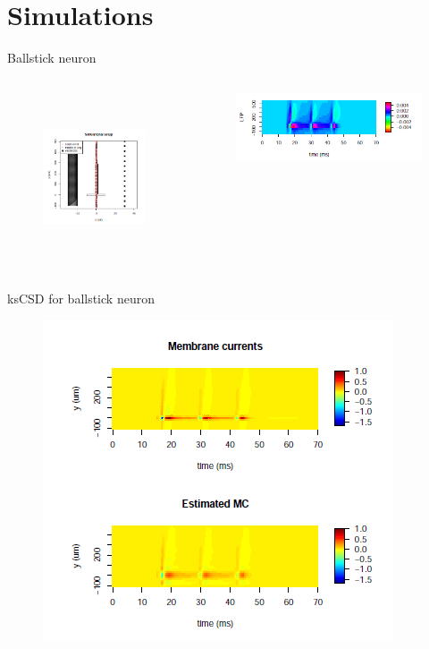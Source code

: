 \documentclass[11pt,a4paper,titlepage]{beamer}
\begin{document}
\section{Simulations}
\begin{frame}{Ballstick neuron}
\begin{columns}
\begin{figure}
\includegraphics[height=5cm]{plots/bssetup.png}

\end{figure}
\begin{figure}
\includegraphics[height=3 cm]{plots/bsLFP.png}
\end{figure}

\end{columns}
\end{frame}

\begin{frame}{ksCSD for ballstick neuron}
\begin{figure}
\includegraphics[height=8 cm]{plots/bsCSD.png}
\end{figure}

\end{frame}
\end{document}
